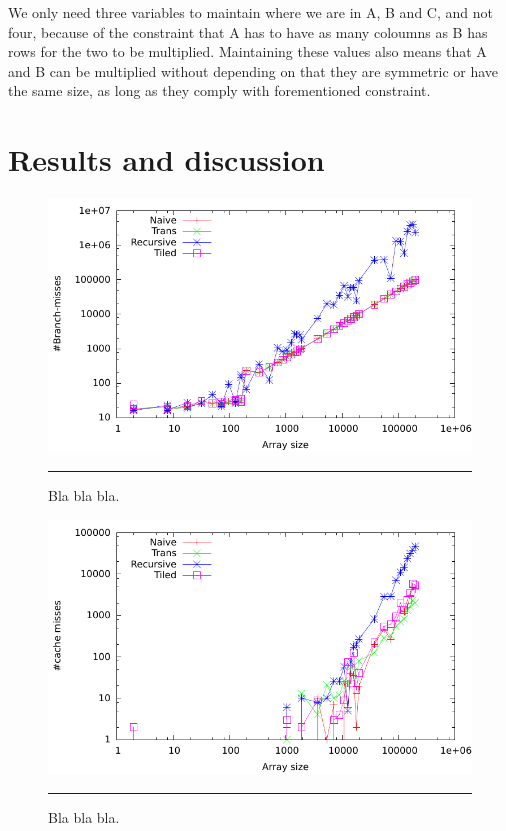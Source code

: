 We only need three variables to maintain where we are in A, B and C, and not four, because of the constraint that A has to have as many coloumns as B has rows for the two to be multiplied. 
Maintaining these values also means that A and B can be multiplied without depending on that they are symmetric or have the same size, as long as they comply with forementioned constraint.



\section{Results and discussion}



\begin{figure}[htbp]
	\centering
		\includegraphics[width=\textwidth]{./Figures/Project2a/Branch_misses.pdf}
		\rule{35em}{0.5pt}
	\caption[Branch misses]{
	Bla bla bla.
	}
	\label{fig:Branch_misses}
\end{figure}


\begin{figure}[htbp]
	\centering
		\includegraphics[width=\textwidth]{./Figures/Project2a/Cache_misses.pdf}
		\rule{35em}{0.5pt}
	\caption[Cache misses]{
	Bla bla bla.
	}
	\label{fig:Cache_misses}
\end{figure}



